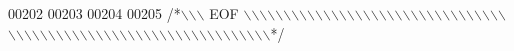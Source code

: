 \begin{DoxyCode}
00202 
00203 
00204 
00205 \textcolor{comment}{/*\(\backslash\)\(\backslash\)\(\backslash\) EOF \(\backslash\)\(\backslash\)\(\backslash\)\(\backslash\)\(\backslash\)\(\backslash\)\(\backslash\)\(\backslash\)\(\backslash\)\(\backslash\)\(\backslash\)\(\backslash\)\(\backslash\)\(\backslash\)\(\backslash\)\(\backslash\)\(\backslash\)\(\backslash\)\(\backslash\)\(\backslash\)\(\backslash\)\(\backslash\)\(\backslash\)\(\backslash\)\(\backslash\)\(\backslash\)\(\backslash\)\(\backslash\)\(\backslash\)\(\backslash\)\(\backslash\)\(\backslash\)\(\backslash\)\(\backslash\)\(\backslash\)\(\backslash\)\(\backslash\)\(\backslash\)\(\backslash\)\(\backslash\)\(\backslash\)\(\backslash\)\(\backslash\)\(\backslash\)\(\backslash\)\(\backslash\)\(\backslash\)\(\backslash\)\(\backslash\)\(\backslash\)\(\backslash\)\(\backslash\)\(\backslash\)\(\backslash\)\(\backslash\)\(\backslash\)\(\backslash\)\(\backslash\)\(\backslash\)\(\backslash\)\(\backslash\)\(\backslash\)\(\backslash\)\(\backslash\)\(\backslash\)\(\backslash\)*/}
\end{DoxyCode}
